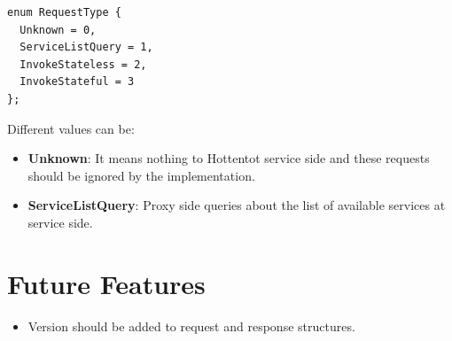 \documentclass[10pt,a4paper]{article}
\begin{document}
\begin{verbatim}
enum RequestType { 
  Unknown = 0, 
  ServiceListQuery = 1, 
  InvokeStateless = 2, 
  InvokeStateful = 3 
};
\end{verbatim}

\noindent
Different values can be:
\begin{itemize}
  \item \textbf{Unknown}: It means nothing to Hottentot service side and these requests should be ignored by the implementation.
  \item \textbf{ServiceListQuery}: Proxy side queries about the list of available services at service side.
\end{itemize}

\section {Future Features}
\begin{itemize}
  \item Version should be added to request and response structures.
\end{itemize}
\end{document}
